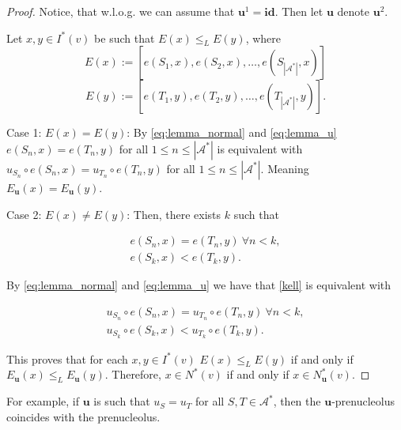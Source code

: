 \documentclass[a4paper,12pt]{article}
\theoremstyle{definition}
\theoremstyle{remark}
\begin{document}
\begin{proof}
Notice, that w.l.o.g. we can assume that $\mathbf{u}^1 = \mathbf{id}$. Then let $\mathbf{u}$ denote $\mathbf{u}^2$.

Let $x, y \in I^*(v)$ be such that $E(x) \leq _L E(y)$, where
\begin{equation*}
E(x) := [e(S_1, x), e(S_2, x), \dots , e(S_{|\mathcal{A}^*|}, x)]
\end{equation*}
\begin{equation*}
E(y) := [e(T_1, y), e(T_2, y), \dots , e(T_{|\mathcal{A}^*|}, y)] .
\end{equation*}

\bigskip

Case 1: $E(x) = E(y)$: By \eqref{eq:lemma_normal} and \eqref{eq:lemma_u} $e(S_n, x) = e(T_n, y)$ for all $1\leq n \leq |\mathcal{A}^*|$ is equivalent with $u_{S_n}\circ e(S_n, x) = u_{T_n} \circ e(T_n, y)$  for all $1\leq n \leq |\mathcal{A}^*|$. Meaning $E_{\mathbf{u}}(x) = E_{\mathbf{u}}(y)$.

Case 2: $E(x) \neq E(y)$: Then, there exists $k$ such that

\begin{equation}\label{kell}
\begin{split}
e(S_n, x) = e(T_n, y) \ \forall n<k, \\
e(S_k, x) < e(T_k, y).
\end{split}
\end{equation}

By \eqref{eq:lemma_normal} and \eqref{eq:lemma_u} we have that \eqref{kell} is equivalent with

\begin{equation}
\begin{split}
u_{S_n} \circ e(S_n, x) = u_{T_n} \circ e(T_n, y) \ \forall n<k, \\
u_{S_k} \circ e(S_k, x) < u_{T_k} \circ e(T_k, y).
\end{split}
\end{equation}

This proves that for each $x, y \in I^*(v)$ $E(x) \leq _L E(y)$ if and only if $E_{\mathbf{u}}(x) \leq _L E_{\mathbf{u}}(y)$. Therefore, $x\in N^*(v)$ if and only if $x\in N_{\mathbf{u}}^*(v)$.
\end{proof}

For example, if $\mathbf{u}$ is such that $u_S = u_T$ for all $S, T \in \mathcal{A}^\ast$, then the $\mathbf{u}$-prenucleolus coincides with the prenucleolus.
\end{document}
